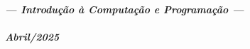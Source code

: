 \begin{coverpages}
\vspace{1cm}


\begin{center}
\textit{\textbf{\Large%
--- Introdução à Computação e Programação ---\\
\ \\
Abril/2025}}
\newpage
\ \\
\end{center}



\end{coverpages}
